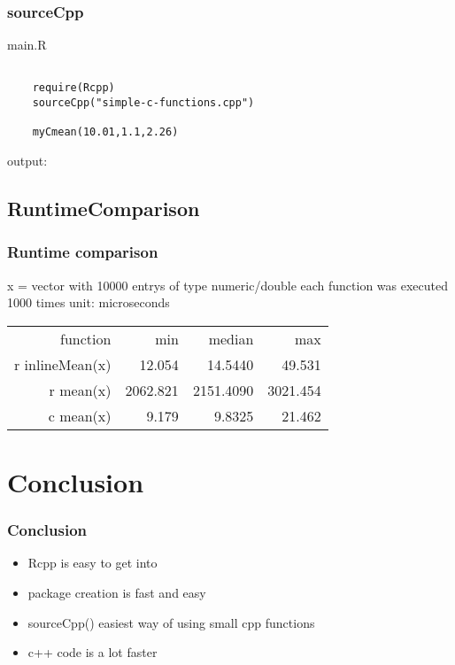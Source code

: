 \documentclass[hyperef={
    colorlinks=true,
    linkcolor=blue,
    filecolor=black,
urlcolor=blue}
]{beamer}
\begin{document}
\begin{frame}[fragile]
\frametitle{sourceCpp}
main.R
\begin{verbatim}

    require(Rcpp)
    sourceCpp("simple-c-functions.cpp")

    myCmean(10.01,1.1,2.26)
\end{verbatim}
output: 

\end{frame}

\subsection{RuntimeComparison}
\begin{frame}
\frametitle{Runtime comparison}

x = vector with 10000 entrys of type numeric/double\newline
each function was executed 1000 times\newline
\newline
unit: microseconds\newline

\begin{tabular}{rrrr}
function & min & median & max \\
r inlineMean(x) & 12.054 & 14.5440 & 49.531 \\
r mean(x) & 2062.821 & 2151.4090 & 3021.454 \\
c mean(x) & 9.179 & 9.8325 & 21.462 \\
\end{tabular}
\end{frame}

\section{Conclusion}
\begin{frame}
\frametitle{Conclusion}
\begin{itemize}
\item Rcpp is easy to get into
\item package creation is fast and easy
\item sourceCpp() easiest way of using small
      cpp functions
\item c++ code is a lot faster
    
\end{itemize}
\end{frame}
\end{document}
